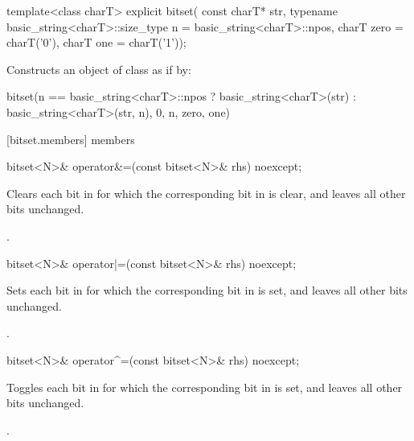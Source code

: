 %
\begin{itemdecl}
template<class charT>
  explicit bitset(
    const charT* str,
    typename basic_string<charT>::size_type n = basic_string<charT>::npos,
    charT zero = charT('0'),
    charT one = charT('1'));
\end{itemdecl}

\begin{itemdescr}
\pnum
\effects Constructs an object of class  as if by:
\begin{codeblock}
bitset(n == basic_string<charT>::npos
          ? basic_string<charT>(str)
          : basic_string<charT>(str, n),
       0, n, zero, one)
\end{codeblock}
\end{itemdescr}


[bitset.members]{ members}

%
\begin{itemdecl}
bitset<N>& operator&=(const bitset<N>& rhs) noexcept;
\end{itemdecl}

\begin{itemdescr}
\pnum
\effects
Clears each bit in
for which the corresponding bit in  is clear, and leaves all other bits unchanged.

\pnum
\returns
{}.
\end{itemdescr}

%
\begin{itemdecl}
bitset<N>& operator|=(const bitset<N>& rhs) noexcept;
\end{itemdecl}

\begin{itemdescr}
\pnum
\effects
Sets each bit in
for which the corresponding bit in  is set, and leaves all other bits unchanged.

\pnum
\returns
{}.
\end{itemdescr}

%
\begin{itemdecl}
bitset<N>& operator^=(const bitset<N>& rhs) noexcept;
\end{itemdecl}

\begin{itemdescr}
\pnum
\effects
Toggles each bit in
for which the corresponding bit in  is set, and leaves all other bits unchanged.

\pnum
\returns
{}.
\end{itemdescr}

